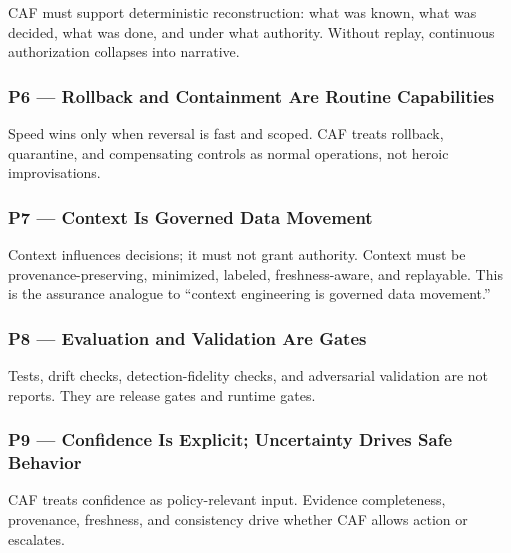 \documentclass[11pt]{article}
\begin{document}
CAF must support deterministic reconstruction: what was known, what was
decided, what was done, and under what authority. Without replay,
continuous authorization collapses into narrative. \cite{ACPRA}

\hypertarget{p6-rollback-and-containment-are-routine-capabilities}{%
\subsubsection{P6 --- Rollback and Containment Are Routine Capabilities}\label{p6-rollback-and-containment-are-routine-capabilities}}

Speed wins only when reversal is fast and scoped. CAF treats rollback,
quarantine, and compensating controls as normal operations, not heroic
improvisations.

\hypertarget{p7-context-is-governed-data-movement}{%
\subsubsection{P7 --- Context Is Governed Data Movement}\label{p7-context-is-governed-data-movement}}

Context influences decisions; it must not grant authority. Context must
be provenance-preserving, minimized, labeled, freshness-aware, and
replayable. This is the assurance analogue to ``context engineering is
governed data movement.'' \cite{ACPRA}

\hypertarget{p8-evaluation-and-validation-are-gates}{%
\subsubsection{P8 --- Evaluation and Validation Are Gates}\label{p8-evaluation-and-validation-are-gates}}

Tests, drift checks, detection-fidelity checks, and adversarial
validation are not reports. They are release gates and runtime gates.
\cite{ACPRA}

\hypertarget{p9-confidence-is-explicit-uncertainty-drives-safe-behavior}{%
\subsubsection{P9 --- Confidence Is Explicit; Uncertainty Drives Safe Behavior}\label{p9-confidence-is-explicit-uncertainty-drives-safe-behavior}}

CAF treats confidence as policy-relevant input. Evidence completeness,
provenance, freshness, and consistency drive whether CAF allows action
or escalates.
\end{document}
